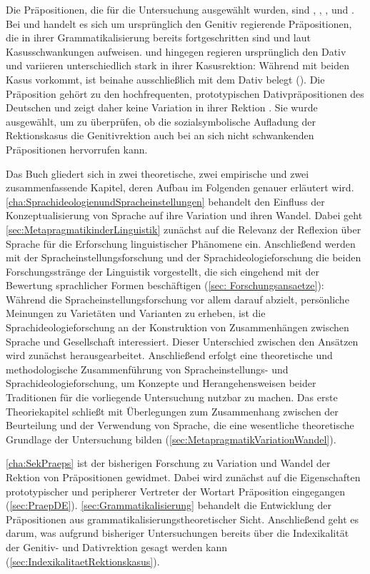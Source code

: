 Die Präpositionen, die für die Untersuchung ausgewählt wurden, sind \wegen{}, \waehrend{}, \dank{}, \gegenueber{} und . 
Bei \wegen{} und \waehrend{} handelt es sich um ursprünglich den Genitiv regierende Präpositionen, die in ihrer Grammatikalisierung bereits fortgeschritten sind und laut \citet[][§915]{Duden2016} Kasusschwankungen aufweisen. 
 und \gegenueber{} hingegen regieren ursprünglich den Dativ und variieren unterschiedlich stark in ihrer Kasusrektion: 
Während \dank{} mit beiden Kasus vorkommt, ist \gegenueber{} beinahe ausschließlich mit dem Dativ belegt (\citealp[][§915]{Duden2016}). 
Die Präposition  gehört zu den hochfrequenten, prototypischen Dativpräpositionen des Deutschen und zeigt daher keine Variation in ihrer Rektion \citep[s.][94]{Szczepaniak2011}. 
Sie wurde ausgewählt, um zu überprüfen, ob die sozialsymbolische Aufladung der Rektionskasus die Genitivrektion auch bei an sich nicht schwankenden Präpositionen hervorrufen kann. 

Das Buch gliedert sich in zwei theoretische, zwei empirische und zwei zusammenfassende Kapitel, deren Aufbau im Folgenden genauer erläutert wird. 
\autoref{cha:SprachideologienundSpracheinstellungen} behandelt den Einfluss der Konzeptualisierung von Sprache auf ihre Variation und ihren Wandel. 
Dabei geht \autoref{sec:MetapragmatikinderLinguistik} zunächst auf die Relevanz der Reflexion über Sprache für die Erforschung linguistischer Phänomene ein. 
Anschließend werden mit der Spracheinstellungsforschung und der Sprachideologieforschung die beiden Forschungsstränge der Linguistik vorgestellt, die sich eingehend mit der Bewertung sprachlicher Formen beschäftigen (\autoref{sec: Forschungsansaetze}):   
Während die Spracheinstellungsforschung vor allem darauf abzielt, persönliche Meinungen zu Varietäten und Varianten zu erheben, ist die Sprachideologieforschung an der Konstruktion von Zusammenhängen zwischen Sprache und Gesellschaft interessiert. 
Dieser Unterschied zwischen den Ansätzen wird zunächst herausgearbeitet. 
Anschließend erfolgt eine theoretische und methodologische Zusammenführung von Spracheinstellungs- und Sprachideologieforschung, um Konzepte und Herangehensweisen beider Traditionen für die vorliegende Untersuchung nutzbar zu machen. 
Das erste Theoriekapitel schließt mit Überlegungen zum Zusammenhang zwischen der Beurteilung und der Verwendung von Sprache, die eine wesentliche theoretische Grundlage der Untersuchung bilden (\autoref{sec:MetapragmatikVariationWandel}). 

\autoref{cha:SekPraeps} ist der bisherigen Forschung zu Variation und Wandel der Rektion von Präpositionen gewidmet. 
Dabei wird zunächst auf die Eigenschaften prototypischer und peripherer Vertreter der Wortart Präposition eingegangen (\autoref{sec:PraepDE}).
\autoref{sec:Grammatikalisierung} behandelt die Entwicklung der Präpositionen aus grammatikalisierungstheoretischer Sicht. 
Anschließend geht es darum, was aufgrund bisheriger Untersuchungen bereits über die Indexikalität der Genitiv- und Dativrektion gesagt werden kann (\autoref{sec:IndexikalitaetRektionskasus}). 

